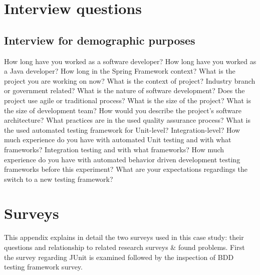 \chapter{Interview questions}
\label{chapter:interview}
\section{Interview for demographic purposes}
    \label{section:demographic}
    \begin{outline}[enumerate]
    \1 How long have you worked as a software developer?
    \1 How long have you worked as a Java developer?
        \2 How long in the Spring Framework context?
    \1 What is the project you are working on now?
        \2 What is the context of project?
            \3 Industry branch or government related?
            \3 What is the nature of software development?
        \2 Does the project use agile or traditional process?
        \2 What is the size of the project?
        \2 What is the size of development team?
        \2 How would you describe the project's software architecture?
        \2 What practices are in the used quality assurance process?
        \2 What is the used automated testing framework for
            \3 Unit-level?
            \3 Integration-level?
    \1 How much experience do you have with automated
        \2 Unit testing and with what frameworks?
        \2 Integration testing and with what frameworks?
    \1 How much experience do you have with automated behavior driven development testing frameworks before this experiment?
    \1 What are your expectations regardings the switch to a new testing framework?
    \end{outline}

\chapter{Surveys}
\label{chapter:surveys}
This appendix explains in detail the two surveys used in this case study: their questions and relationship to related
research surveys \& found problems. First the survey regarding JUnit is examined followed by the inspection of BDD testing
framework survey.
